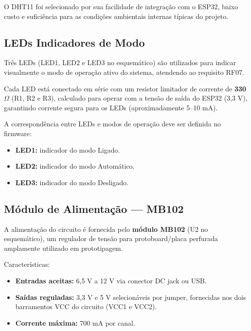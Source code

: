 O DHT11 foi selecionado por sua facilidade de integração com o ESP32, baixo custo
e suficiência para as condições ambientais internas típicas do projeto.

\subsection{LEDs Indicadores de Modo}

Três LEDs (LED1, LED2 e LED3 no esquemático) são utilizados para indicar visualmente
o modo de operação ativo do sistema, atendendo ao requisito RF07.

Cada LED está conectado em série com um resistor limitador de corrente de \textbf{330 $\Omega$}
(R1, R2 e R3), calculado para operar com a tensão de saída do ESP32 (3,3 V), garantindo
corrente segura para os LEDs (aproximadamente 5–10 mA).

A correspondência entre LEDs e modos de operação deve ser definida no firmware:

\begin{itemize}
    \item \textbf{LED1:} indicador do modo Ligado.
    \item \textbf{LED2:} indicador do modo Automático.
    \item \textbf{LED3:} indicador do modo Desligado.
\end{itemize}

\subsection{Módulo de Alimentação — MB102}

A alimentação do circuito é fornecida pelo \textbf{módulo MB102} (U2 no esquemático),
um regulador de tensão para protoboard/placa perfurada amplamente utilizado em
prototipagem.

Características:

\begin{itemize}
    \item \textbf{Entradas aceitas:} 6,5 V a 12 V via conector DC jack ou USB.
    \item \textbf{Saídas reguladas:} 3,3 V e 5 V selecionáveis por jumper, fornecidas
    nos dois barramentos VCC do circuito (VCC1 e VCC2).
    \item \textbf{Corrente máxima:} 700 mA por canal.
\end{itemize}

